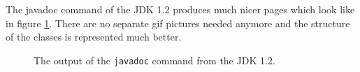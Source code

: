 The javadoc command of the JDK 1.2 produces much nicer pages which
look like in figure \ref{fig:Java2HTMLDoc}. There are no separate 
gif pictures
needed anymore and the structure of the classes is represented
much better.
\begin{figure}[htbp]
  \begin{center}
\quad {}
\quad {}
\quad {}
    \caption{The output of the \texttt{javadoc} command from the JDK 1.2.}
    \label{fig:Java2HTMLDoc}
  \end{center}
\end{figure}

